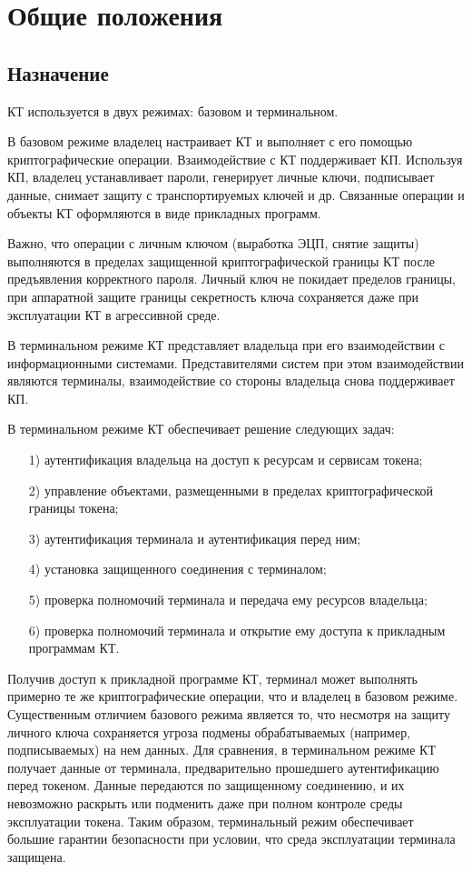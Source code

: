 \chapter{Общие положения}\label{COMMON}

\section{Назначение}

КТ используется в двух режимах: базовом и терминальном.

В базовом режиме владелец настраивает КТ и выполняет с его помощью 
криптографические операции. Взаимодействие с КТ поддерживает КП. 
Используя КП, владелец устанавливает пароли, генерирует личные ключи, 
подписывает данные, снимает защиту с транспортируемых ключей и др.
Связанные операции и объекты КТ оформляются в виде прикладных программ.

Важно, что операции с личным ключом (выработка ЭЦП, снятие защиты) выполняются  
в пределах защищенной криптографической границы КТ после предъявления 
корректного пароля. Личный ключ не покидает пределов границы, при аппаратной 
защите границы секретность ключа сохраняется даже при эксплуатации КТ в 
агрессивной среде.

В терминальном режиме КТ представляет владельца при его взаимодействии с 
информационными системами. Представителями систем при этом взаимодействии
являются терминалы, взаимодействие со стороны владельца снова поддерживает КП. 

В терминальном режиме КТ обеспечивает решение следующих задач: 
\begin{enumerate}
\item[1)]
аутентификация владельца на доступ к ресурсам и сервисам токена; 
\item[2)]
управление объектами, размещенными в пределах криптографической границы токена;
\item[3)]
аутентификация терминала и аутентификация перед ним;
\item[4)]
установка защищенного соединения с терминалом;
\item[5)]
проверка полномочий терминала и передача ему ресурсов владельца;
\item[6)]
проверка полномочий терминала и открытие ему доступа к прикладным программам КТ. 
\end{enumerate}

Получив доступ к прикладной программе КТ, терминал может выполнять примерно те 
же криптографические операции, что и владелец в базовом режиме. Существенным
отличием базового режима является то, что несмотря на защиту личного ключа
сохраняется угроза подмены обрабатываемых (например, подписываемых) 
на нем данных. Для сравнения, в терминальном режиме КТ получает данные от
терминала, предварительно прошедшего аутентификацию перед токеном. Данные
передаются по защищенному соединению, и их невозможно раскрыть или подменить
даже при полном контроле среды эксплуатации токена. Таким образом, терминальный
режим обеспечивает большие гарантии безопасности при условии, что среда
эксплуатации терминала защищена.

